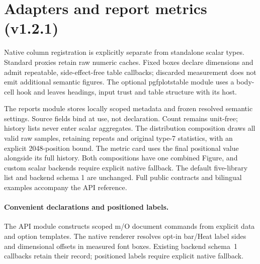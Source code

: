 \section{Adapters and report metrics (v1.2.1)}
Native column registration is explicitly separate from standalone scalar types.
Standard proxies retain raw numeric caches. Fixed boxes declare dimensions and
admit repeatable, side-effect-free table callbacks; discarded measurement does
not emit additional semantic figures. The optional pgfplotstable module uses a
body-cell hook and leaves headings, input trust and table structure with its host.

The reports module stores locally scoped metadata and frozen resolved semantic
settings. Source fields bind at use, not declaration. Count remains unit-free;
history lists never enter scalar aggregates. The distribution composition draws
all valid raw samples, retaining repeats and original type-7 statistics, with an
explicit 2048-position bound. The metric card uses the final positional value
alongside its full history. Both compositions have one combined Figure, and
custom scalar backends require explicit native fallback. The default five-library
list and backend schema 1 are unchanged. Full public contracts and bilingual
examples accompany the API reference.

\paragraph{Convenient declarations and positioned labels.}
The API module constructs scoped m/O document commands from explicit data and option templates.
The native renderer resolves opt-in bar/Heat label sides and dimensional offsets in measured font boxes.
Existing backend schema~1 callbacks retain their record; positioned labels require explicit native fallback.
